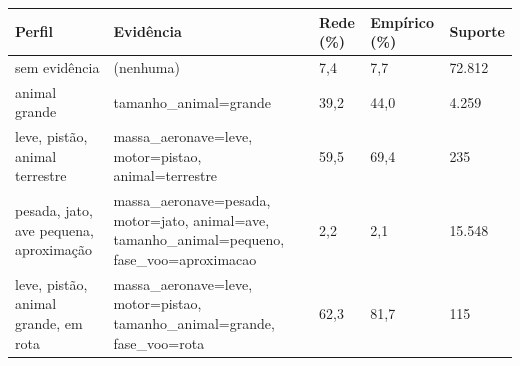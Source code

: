 \begin{tabular}{lllll}
\toprule
Perfil & Evidência & Rede (\%) & Empírico (\%) & Suporte \\
\midrule
sem evidência & (nenhuma) & 7,4 & 7,7 & 72.812 \\
animal grande & tamanho\_animal=grande & 39,2 & 44,0 & 4.259 \\
leve, pistão, animal terrestre & massa\_aeronave=leve, motor=pistao, animal=terrestre & 59,5 & 69,4 & 235 \\
pesada, jato, ave pequena, aproximação & massa\_aeronave=pesada, motor=jato, animal=ave, tamanho\_animal=pequeno, fase\_voo=aproximacao & 2,2 & 2,1 & 15.548 \\
leve, pistão, animal grande, em rota & massa\_aeronave=leve, motor=pistao, tamanho\_animal=grande, fase\_voo=rota & 62,3 & 81,7 & 115 \\
\bottomrule
\end{tabular}
